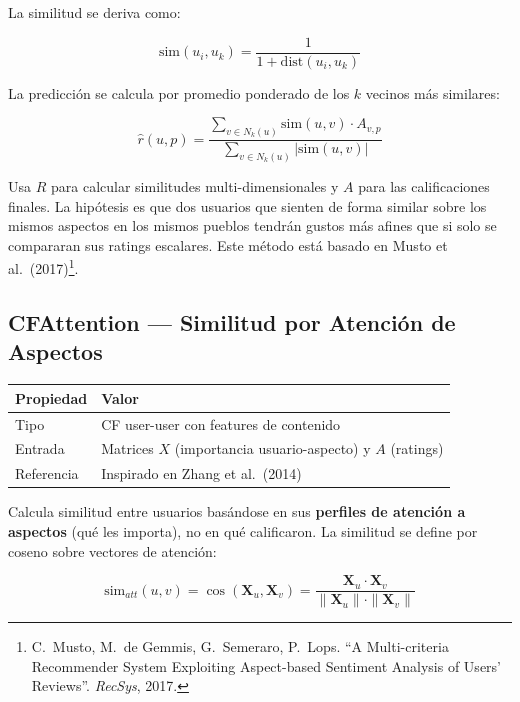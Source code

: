\documentclass[11pt, a4paper]{article}
\begin{document}
La similitud se deriva como:

\begin{equation}
    \text{sim}(u_i, u_k) = \frac{1}{1 + \text{dist}(u_i, u_k)}
\end{equation}

La predicción se calcula por promedio ponderado de los $k$ vecinos más similares:

\begin{equation}
    \hat{r}(u, p) = \frac{\sum_{v \in N_k(u)} \text{sim}(u, v) \cdot A_{v,p}}{\sum_{v \in N_k(u)} |\text{sim}(u, v)|}
\end{equation}

Usa $R$ para calcular similitudes multi-dimensionales y $A$ para las calificaciones finales. La hipótesis es que dos usuarios que sienten de forma similar sobre los mismos aspectos en los mismos pueblos tendrán gustos más afines que si solo se compararan sus ratings escalares. Este método está basado en Musto et al.\ (2017)\footnote{C.\ Musto, M.\ de Gemmis, G.\ Semeraro, P.\ Lops. ``A Multi-criteria Recommender System Exploiting Aspect-based Sentiment Analysis of Users' Reviews''. \textit{RecSys}, 2017.}.

\subsection{CFAttention --- Similitud por Atención de Aspectos}

\begin{table}[H]\centering
\begin{tabular}{ll}
\toprule
\textbf{Propiedad} & \textbf{Valor} \\
\midrule
Tipo      & CF user-user con features de contenido \\
Entrada   & Matrices $X$ (importancia usuario-aspecto) y $A$ (ratings) \\
Referencia & Inspirado en Zhang et al.\ (2014) \\
\bottomrule
\end{tabular}
\end{table}

Calcula similitud entre usuarios basándose en sus \textbf{perfiles de atención a aspectos} (qué les importa), no en qué calificaron. La similitud se define por coseno sobre vectores de atención:

\begin{equation}
    \text{sim}_{att}(u, v) = \cos(\mathbf{X}_u, \mathbf{X}_v) = \frac{\mathbf{X}_u \cdot \mathbf{X}_v}{\|\mathbf{X}_u\| \cdot \|\mathbf{X}_v\|}
\end{equation}
\end{document}
